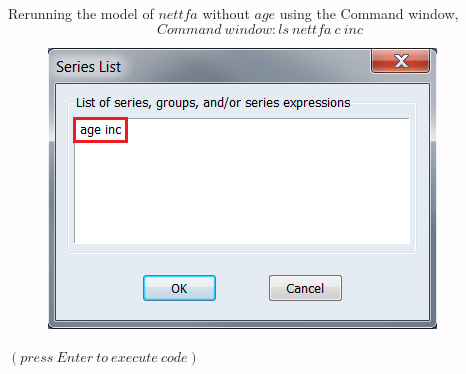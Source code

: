 \documentclass[12pt]{report}
\begin{document}
\noindent Rerunning the model of $nettfa$ without $age$ using the Command window,
$$Command\ window: ls\ nettfa\ c\ inc$$
\begin{figure}[H]
	\centering
	\includegraphics{tute6_q3_9}
\end{figure}
\vspace{-\baselineskip} \centering $(press\ Enter\ to\ execute\ code)$
\end{document}
